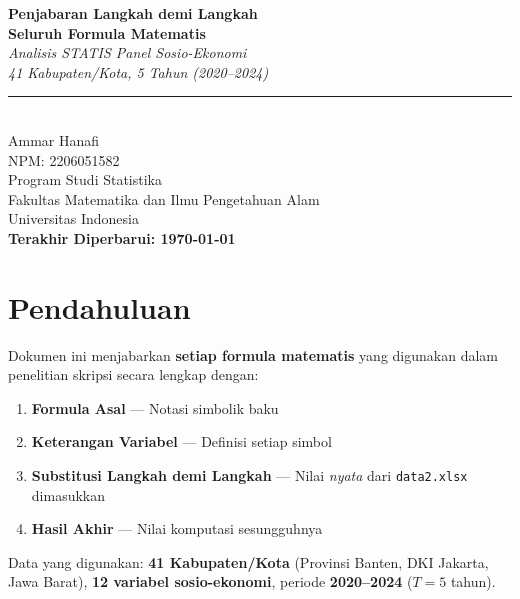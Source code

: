 \documentclass[11pt,a4paper]{article}
\begin{document}
\begin{titlepage}
  \centering
  \vspace*{3cm}
  {\Huge\bfseries Penjabaran Langkah demi Langkah\\[0.5em]
  Seluruh Formula Matematis\\[1em]}
  {\Large\textit{Analisis STATIS Panel Sosio-Ekonomi\\
  41 Kabupaten/Kota, 5 Tahun (2020--2024)}}\\[3em]
  \rule{0.6\textwidth}{0.5pt}\\[1.5em]
  {\large Ammar Hanafi\\NPM: 2206051582\\[0.5em]
  Program Studi Statistika\\
  Fakultas Matematika dan Ilmu Pengetahuan Alam\\
  Universitas Indonesia\\[1.5em]
  \textbf{Terakhir Diperbarui: \today}}
  \vspace*{3cm}
\end{titlepage}

\tableofcontents
\newpage

\section*{Pendahuluan} \label{sec:method}
Dokumen ini menjabarkan \textbf{setiap formula matematis} yang digunakan dalam penelitian skripsi secara lengkap dengan:
\begin{enumerate}
  \item \textbf{Formula Asal} --- Notasi simbolik baku
  \item \textbf{Keterangan Variabel} --- Definisi setiap simbol
  \item \textbf{Substitusi Langkah demi Langkah} --- Nilai \emph{nyata} dari \texttt{data2.xlsx} dimasukkan
  \item \textbf{Hasil Akhir} --- Nilai komputasi sesungguhnya
\end{enumerate}

\noindent Data yang digunakan: \textbf{41 Kabupaten/Kota} (Provinsi Banten, DKI Jakarta, Jawa Barat), \textbf{12 variabel sosio-ekonomi}, periode \textbf{2020--2024} ($T = 5$ tahun).
\end{document}
